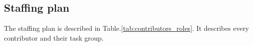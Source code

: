 \subsection{Staffing plan}

The staffing plan is described in Table.\:\ref{tab:contributors_roles}. It describes every contributor and their task group.


